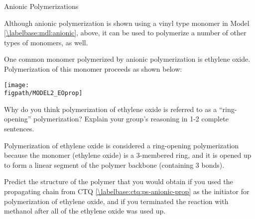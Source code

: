 \begin{activity}{Anionic Polymerizations}
\begin{ctqs}
		\begin{solution}[2in]
		\studentdisplay{}
		\end{solution}

		
\end{ctqs}


\clearpage
\begin{model}
	\label{\labelbase:mdl:anionicEO}

	Although anionic polymerization is shown using a vinyl type monomer in Model \ref{\labelbase:mdl:anionic}, above, it can be used to polymerize a number of other types of monomers, as well.
	
	One common monomer polymerized by anionic polymerization is ethylene oxide.  Polymerization of this monomer proceeds as shown below:
	
	\centerline{\texttt{[image: \\figpath/MODEL2\_EOprop]}}

\end{model}

\begin{ctqs}
	
	\question Why do you think polymerization of ethylene oxide is referred to as a ``ring-opening'' polymerization?  Explain your group's reasoning in 1-2 complete sentences.
	
		\begin{solution}[1in]
			Polymerization of ethylene oxide is considered a ring-opening polymerization because the monomer (ethylene oxide) is a 3-membered ring, and it is opened up to form a linear segment of the polymer backbone (containing 3 bonds).
		\end{solution}
	
	\question Predict the structure of the polymer that you would obtain if you used the propagating chain from CTQ \ref{\labelbase:ctq:ps-anionic-prop} as the initiator for polymerization of ethylene oxide, and if you terminated the reaction with methanol after all of the ethylene oxide was used up.
	
		\begin{solution}[1.75in]
		\studentdisplay{}
\end{solution}
\end{ctqs}
\end{activity}
